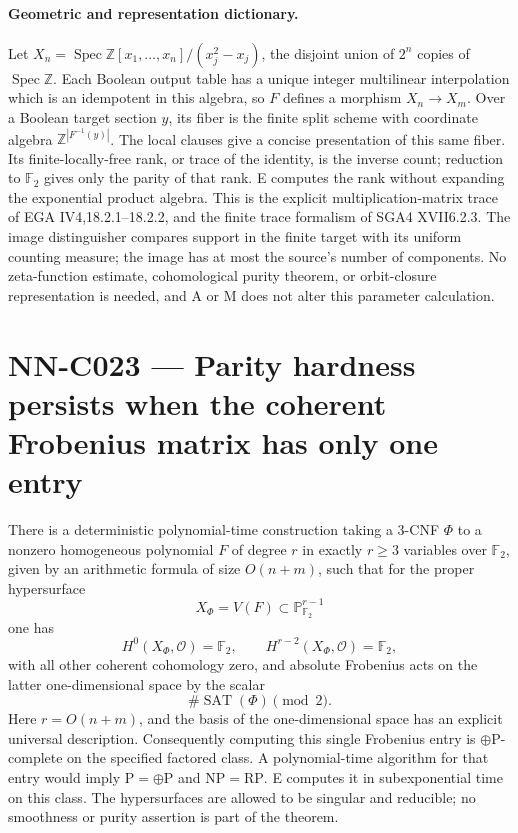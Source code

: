 \paragraph{Geometric and representation dictionary.}
Let $X_n=\operatorname{Spec}\mathbb Z[x_1,\ldots,x_n]/(x_j^2-x_j)$, the disjoint union of $2^n$ copies of $\operatorname{Spec}\mathbb Z$. Each Boolean output table has a unique integer multilinear interpolation which is an idempotent in this algebra, so $F$ defines a morphism $X_n\to X_m$. Over a Boolean target section $y$, its fiber is the finite split scheme with coordinate algebra $\mathbb Z^{|F^{-1}(y)|}$. The local clauses give a concise presentation of this same fiber. Its finite-locally-free rank, or trace of the identity, is the inverse count; reduction to $\mathbb F_2$ gives only the parity of that rank. E computes the rank without expanding the exponential product algebra. This is the explicit multiplication-matrix trace of EGA IV4,18.2.1--18.2.2, and the finite trace formalism of SGA4 XVII6.2.3. The image distinguisher compares support in the finite target with its uniform counting measure; the image has at most the source's number of components. No zeta-function estimate, cohomological purity theorem, or orbit-closure representation is needed, and A or M does not alter this parameter calculation.



\section{NN-C023 --- Parity hardness persists when the coherent Frobenius matrix has only one entry}
\begin{proposition}[NN-C023]
There is a deterministic polynomial-time construction taking a 3-CNF $\Phi$ to a nonzero homogeneous polynomial $F$ of degree $r$ in exactly $r\geq3$ variables over $\mathbb F_2$, given by an arithmetic formula of size $O(n+m)$, such that for the proper hypersurface
\[
 X_\Phi=V(F)\subset\mathbb P^{r-1}_{\mathbb F_2}
\]
one has
\[
 H^0(X_\Phi,\mathcal O)=\mathbb F_2,\qquad
 H^{r-2}(X_\Phi,\mathcal O)=\mathbb F_2,
\]
with all other coherent cohomology zero, and absolute Frobenius acts on the latter one-dimensional space by the scalar
\[
 \#\operatorname{SAT}(\Phi)\pmod2.
\]
Here $r=O(n+m)$, and the basis of the one-dimensional space has an explicit universal description. Consequently computing this single Frobenius entry is $\oplus\mathrm P$-complete on the specified factored class. A polynomial-time algorithm for that entry would imply $\mathrm P=\oplus\mathrm P$ and $\mathrm{NP}=\mathrm{RP}$. E computes it in subexponential time on this class. The hypersurfaces are allowed to be singular and reducible; no smoothness or purity assertion is part of the theorem.
\end{proposition}
